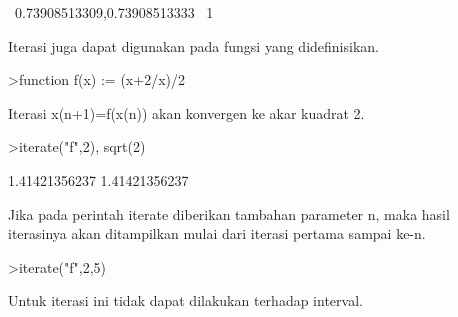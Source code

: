 \documentclass[12pt,arial,letterpaper]{book}
\begin{document}
\begin{eulernootebook}
\begin{eulercomment}
\begin{eulercomment}
\begin{eulernootebook}
\begin{eulercomment}
\begin{eulercomment}
\begin{eulercomment}
\begin{eulercomment}
\begin{eulercomment}
\begin{eulercomment}
\begin{eulernotebook}
\begin{eulercomment}
\begin{eulercomment}
\begin{eulercomment}
\begin{eulercomment}
\begin{eulercomment}
\begin{eulercomment}
\begin{eulercomment}
\begin{eulercomment}
\begin{eulercomment}
\begin{eulercomment}
\begin{eulercomment}
\begin{eulercomment}
\begin{eulercomment}
\begin{eulercomment}
\begin{eulercomment}
\begin{eulercomment}
\begin{eulercomment}
\begin{eulercomment}
\begin{eulercomment}
\begin{eulercomment}
\begin{eulercomment}
\begin{eulercomment}
\begin{eulercomment}
\begin{eulercomment}
\begin{eulercomment}
\begin{eulercomment}
\begin{eulercomment}
\begin{eulercomment}
\begin{eulercomment}
\begin{eulercomment}
\begin{euleroutput}
  ~0.73908513309,0.73908513333~
  1
\end{euleroutput}
\begin{eulercomment}
Iterasi juga dapat digunakan pada fungsi yang didefinisikan.
\end{eulercomment}
\begin{eulerprompt}
>function f(x) := (x+2/x)/2
\end{eulerprompt}
\begin{eulercomment}
Iterasi x(n+1)=f(x(n)) akan konvergen ke akar kuadrat 2.
\end{eulercomment}
\begin{eulerprompt}
>iterate("f",2), sqrt(2)
\end{eulerprompt}
\begin{euleroutput}
  1.41421356237
  1.41421356237
\end{euleroutput}
\begin{eulercomment}
Jika pada perintah iterate diberikan tambahan parameter n, maka hasil
iterasinya akan ditampilkan mulai dari iterasi pertama sampai ke-n.
\end{eulercomment}
\begin{eulerprompt}
>iterate("f",2,5)
\end{eulerprompt}
\begin{euleroutput}
  [2,  1.5,  1.41667,  1.41422,  1.41421,  1.41421]
\end{euleroutput}
\begin{eulercomment}
Untuk iterasi ini tidak dapat dilakukan terhadap interval.
\end{eulercomment}

\end{eulercomment}
\end{eulercomment}
\end{eulercomment}
\end{eulercomment}
\end{eulercomment}
\end{eulercomment}
\end{eulercomment}
\end{eulercomment}
\end{eulercomment}
\end{eulercomment}
\end{eulercomment}
\end{eulercomment}
\end{eulercomment}
\end{eulercomment}
\end{eulercomment}
\end{eulercomment}
\end{eulercomment}
\end{eulercomment}
\end{eulercomment}
\end{eulercomment}
\end{eulercomment}
\end{eulercomment}
\end{eulercomment}
\end{eulercomment}
\end{eulercomment}
\end{eulercomment}
\end{eulercomment}
\end{eulercomment}
\end{eulercomment}
\end{eulercomment}
\end{eulernotebook}
\end{eulercomment}
\end{eulercomment}
\end{eulercomment}
\end{eulercomment}
\end{eulercomment}
\end{eulercomment}
\end{eulernootebook}
\end{eulercomment}
\end{eulercomment}
\end{eulernootebook}
\end{document}
